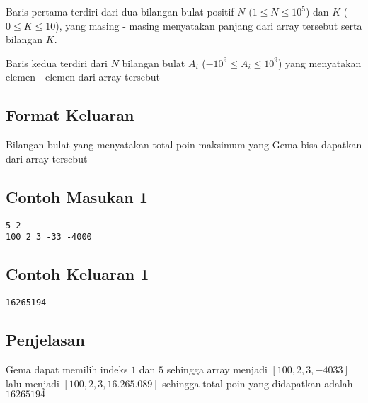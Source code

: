 \documentclass{article}
\begin{document}
Baris pertama terdiri dari dua bilangan bulat positif $N$ ($1 \leq N \leq 10^{5}$) dan $K$ ($0 \leq K \leq 10$), yang masing - masing menyatakan panjang dari array tersebut serta bilangan $K$.

Baris kedua terdiri dari $N$ bilangan bulat $A_{i}$ ($-10^9 \leq A_{i} \leq 10^9$) yang menyatakan elemen - elemen dari array tersebut

\subsection*{Format Keluaran}

Bilangan bulat yang menyatakan total poin maksimum yang Gema bisa dapatkan dari array tersebut

\begin{multicols}{2}
\subsection*{Contoh Masukan 1}
\begin{lstlisting}
5 2
100 2 3 -33 -4000 
\end{lstlisting}
\columnbreak
\subsection*{Contoh Keluaran 1}
\begin{lstlisting}
16265194
\end{lstlisting}
\vfill
\null
\end{multicols}


\subsection*{Penjelasan}

Gema dapat memilih indeks $1$ dan $5$ sehingga array menjadi $[100,2,3,-4033]$ lalu menjadi $[100,2,3,16.265.089]$ sehingga total poin yang didapatkan adalah $16265194$  
\end{document}
